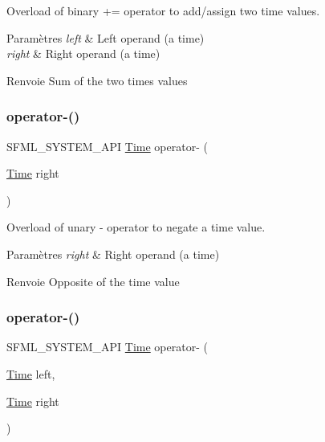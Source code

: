 Overload of binary += operator to add/assign two time values. 


\begin{DoxyParams}{Paramètres}
{\em left} & Left operand (a time) \\
\hline
{\em right} & Right operand (a time)\\
\hline
\end{DoxyParams}
\begin{DoxyReturn}{Renvoie}
Sum of the two times values 
\end{DoxyReturn}
\mbox{\label{classsf_1_1Time_a1b23b91cf367764338c2ff922c65da4e}} 
\subsubsection{\texorpdfstring{operator-\/()}{operator-()}\hspace{0.1cm}{\footnotesize\ttfamily [1/2]}}
{\footnotesize\ttfamily S\+F\+M\+L\+\_\+\+S\+Y\+S\+T\+E\+M\+\_\+\+A\+PI \hyperlink{classsf_1_1Time}{Time} operator-\/ (\begin{DoxyParamCaption}\item[{\hyperlink{classsf_1_1Time}{Time}}]{right }\end{DoxyParamCaption})\hspace{0.3cm}{\ttfamily [related]}}



Overload of unary -\/ operator to negate a time value. 


\begin{DoxyParams}{Paramètres}
{\em right} & Right operand (a time)\\
\hline
\end{DoxyParams}
\begin{DoxyReturn}{Renvoie}
Opposite of the time value 
\end{DoxyReturn}
\mbox{\label{classsf_1_1Time_ace92ab9bc7aec80239af7218cd89cc80}} 
\subsubsection{\texorpdfstring{operator-\/()}{operator-()}\hspace{0.1cm}{\footnotesize\ttfamily [2/2]}}
{\footnotesize\ttfamily S\+F\+M\+L\+\_\+\+S\+Y\+S\+T\+E\+M\+\_\+\+A\+PI \hyperlink{classsf_1_1Time}{Time} operator-\/ (\begin{DoxyParamCaption}\item[{\hyperlink{classsf_1_1Time}{Time}}]{left,  }\item[{\hyperlink{classsf_1_1Time}{Time}}]{right }\end{DoxyParamCaption})\hspace{0.3cm}{\ttfamily [related]}}




